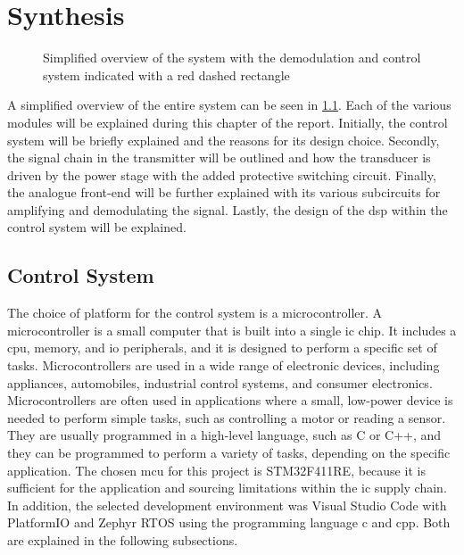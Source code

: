 \chapter{Synthesis} \label{cha:synthesis} %

\begin{figure}[ht]
	\centering
	\resizebox{\textwidth}{!}{
		
	}
	\caption[Simplified overview of the system]{Simplified overview of the system with the demodulation and control system indicated with a red dashed rectangle}
	\label{fig:1_system_overview}
\end{figure}
A simplified overview of the entire system can be seen in \cref{fig:1_system_overview}. Each of the various modules will be explained during this chapter of the report. Initially, the control system will be briefly explained and the reasons for its design choice. Secondly, the signal chain in the transmitter will be outlined and how the transducer is driven by the power stage with the added protective switching circuit. Finally, the analogue front-end will be further explained with its various subcircuits for amplifying and demodulating the signal. Lastly, the design of the \gls{dsp} within the control system will be explained.

\section{Control System}
The choice of platform for the control system is a microcontroller. A microcontroller is a small computer that is built into a single \gls{ic} chip. It includes a \gls{cpu}, memory, and \gls{io} peripherals, and it is designed to perform a specific set of tasks. Microcontrollers are used in a wide range of electronic devices, including appliances, automobiles, industrial control systems, and consumer electronics. Microcontrollers are often used in applications where a small, low-power device is needed to perform simple tasks, such as controlling a motor or reading a sensor. They are usually programmed in a high-level language, such as C or C++, and they can be programmed to perform a variety of tasks, depending on the specific application. The chosen \gls{mcu} for this project is STM32F411RE, because it is sufficient for the application and sourcing limitations within the \gls{ic} supply chain. In addition, the selected development environment was Visual Studio Code with PlatformIO and Zephyr RTOS using the programming language \gls{c} and \gls{cpp}. Both are explained in the following subsections.

